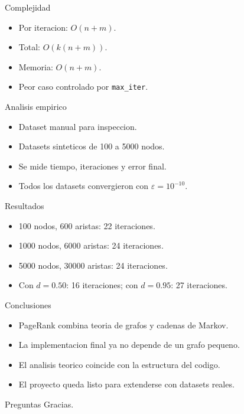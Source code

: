 \documentclass{beamer}
\begin{document}
\begin{frame}{Complejidad}
  \begin{itemize}
    \item Por iteracion: $O(n+m)$.
    \item Total: $O(k(n+m))$.
    \item Memoria: $O(n+m)$.
    \item Peor caso controlado por \texttt{max\_iter}.
  \end{itemize}
\end{frame}

\begin{frame}{Analisis empirico}
  \begin{itemize}
    \item Dataset manual para inspeccion.
    \item Datasets sinteticos de 100 a 5000 nodos.
    \item Se mide tiempo, iteraciones y error final.
    \item Todos los datasets convergieron con $\varepsilon=10^{-10}$.
  \end{itemize}
\end{frame}

\begin{frame}{Resultados}
  \begin{itemize}
    \item 100 nodos, 600 aristas: 22 iteraciones.
    \item 1000 nodos, 6000 aristas: 24 iteraciones.
    \item 5000 nodos, 30000 aristas: 24 iteraciones.
    \item Con $d=0.50$: 16 iteraciones; con $d=0.95$: 27 iteraciones.
  \end{itemize}
\end{frame}

\begin{frame}{Conclusiones}
  \begin{itemize}
    \item PageRank combina teoria de grafos y cadenas de Markov.
    \item La implementacion final ya no depende de un grafo pequeno.
    \item El analisis teorico coincide con la estructura del codigo.
    \item El proyecto queda listo para extenderse con datasets reales.
  \end{itemize}
\end{frame}

\begin{frame}{Preguntas}
  \centering
  Gracias.
\end{frame}
\end{document}
